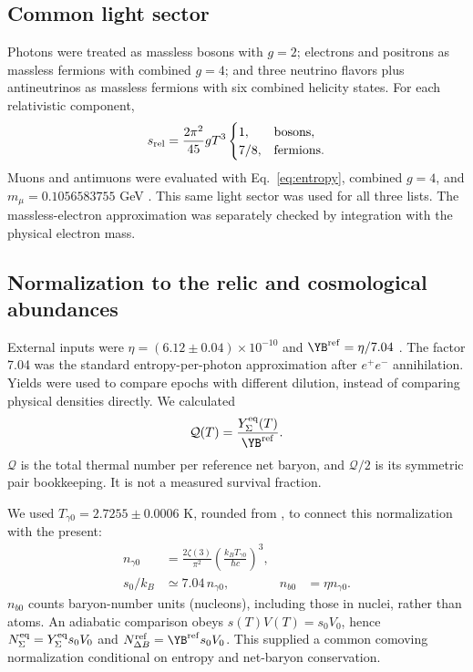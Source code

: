 \subsection{Common light sector}
Photons were treated as massless bosons with $g=2$; electrons and positrons as massless fermions with combined $g=4$; and three neutrino flavors plus antineutrinos as massless fermions with six combined helicity states. For each relativistic component,
\begin{equation}
s_{\rm rel}=\frac{2\pi^2}{45}gT^3
\begin{cases}
1,&\text{bosons},\\
7/8,&\text{fermions}.
\end{cases}
\end{equation}
Muons and antimuons were evaluated with Eq.~\eqref{eq:entropy}, combined $g=4$, and $m_\mu=0.1056583755$ GeV \citep{PDG2025}. This same light sector was used for all three lists. The massless-electron approximation was separately checked by integration with the physical electron mass.

\subsection{Normalization to the relic and cosmological abundances}
External inputs were $\eta=(6.12\pm0.04)\times10^{-10}$ and $\YB^{\rm ref}=\eta/7.04$ \citep{Fields2025}. The factor 7.04 was the standard entropy-per-photon approximation after $e^+e^-$ annihilation. Yields were used to compare epochs with different dilution, instead of comparing physical densities directly. We calculated
\begin{equation}
\mathcal Q(T)=\frac{Y_\Sigma^{\rm eq}(T)}{\YB^{\rm ref}}.
\label{eq:populationratio}
\end{equation}
$\mathcal Q$ is the total thermal number per reference net baryon, and $\mathcal Q/2$ is its symmetric pair bookkeeping. It is not a measured survival fraction.

We used $T_{\gamma0}=2.7255\pm0.0006$ K, rounded from \citet{Fixsen2009}, to connect this normalization with the present:
\begin{align}
n_{\gamma0}&=\frac{2\zeta(3)}{\pi^2}
\left(\frac{k_BT_{\gamma0}}{\hbar c}\right)^3,\\
s_0/k_B&\simeq7.04\,n_{\gamma0}, & n_{b0}&=\eta n_{\gamma0}.
\label{eq:today}
\end{align}
$n_{b0}$ counts baryon-number units (nucleons), including those in nuclei, rather than atoms. An adiabatic comparison obeys $s(T)V(T)=s_0V_0$, hence $N_\Sigma^{\rm eq}=Y_\Sigma^{\rm eq}s_0V_0$ and $N_{\Delta B}^{\rm ref}=\YB^{\rm ref}s_0V_0$. This supplied a common comoving normalization conditional on entropy and net-baryon conservation.

